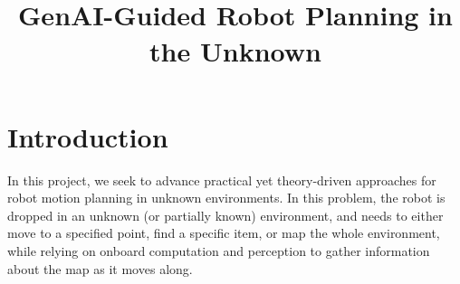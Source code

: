 \documentclass[12pt]{article}
\begin{document}
\title{\vspace{-40pt}{\bf Moshe Buetel and Kiril Solovey}
       \\ {%
       GenAI-Guided Robot Planning in the Unknown} 
}
\date{}
\clearpage
\vspace{-20ex}
\maketitle\thispagestyle{fancy}
\thispagestyle{empty}
\vspace{-8ex}

\frenchspacing

\newcommand{\reduce}{\vspace{-12pt}}




\section{Introduction}
In this project, we seek to advance 
practical yet theory-driven approaches for robot motion planning in unknown environments. In this problem, the robot is dropped in an unknown (or partially known) environment, and needs to either move to a specified point, find a specific item, or map the whole environment, while relying on onboard computation and perception to gather information about the map as it moves along. 
\end{document}
